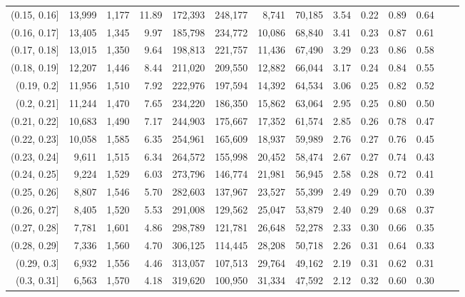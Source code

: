 \begin{tabular}{rrrrrrrrrrrrrr}
(0.15, 0.16]   &  13,999 &  1,177 &   11.89 &  172,393 &  248,177 &   8,741 &  70,185 &  3.54 &  0.22 &  0.89 &      0.64 \\
(0.16, 0.17]   &  13,405 &  1,345 &    9.97 &  185,798 &  234,772 &  10,086 &  68,840 &  3.41 &  0.23 &  0.87 &      0.61 \\
(0.17, 0.18]   &  13,015 &  1,350 &    9.64 &  198,813 &  221,757 &  11,436 &  67,490 &  3.29 &  0.23 &  0.86 &      0.58 \\
(0.18, 0.19]   &  12,207 &  1,446 &    8.44 &  211,020 &  209,550 &  12,882 &  66,044 &  3.17 &  0.24 &  0.84 &      0.55 \\
(0.19, 0.2]    &  11,956 &  1,510 &    7.92 &  222,976 &  197,594 &  14,392 &  64,534 &  3.06 &  0.25 &  0.82 &      0.52 \\
(0.2, 0.21]    &  11,244 &  1,470 &    7.65 &  234,220 &  186,350 &  15,862 &  63,064 &  2.95 &  0.25 &  0.80 &      0.50 \\
(0.21, 0.22]   &  10,683 &  1,490 &    7.17 &  244,903 &  175,667 &  17,352 &  61,574 &  2.85 &  0.26 &  0.78 &      0.47 \\
(0.22, 0.23]   &  10,058 &  1,585 &    6.35 &  254,961 &  165,609 &  18,937 &  59,989 &  2.76 &  0.27 &  0.76 &      0.45 \\
(0.23, 0.24]   &   9,611 &  1,515 &    6.34 &  264,572 &  155,998 &  20,452 &  58,474 &  2.67 &  0.27 &  0.74 &      0.43 \\
(0.24, 0.25]   &   9,224 &  1,529 &    6.03 &  273,796 &  146,774 &  21,981 &  56,945 &  2.58 &  0.28 &  0.72 &      0.41 \\
(0.25, 0.26]   &   8,807 &  1,546 &    5.70 &  282,603 &  137,967 &  23,527 &  55,399 &  2.49 &  0.29 &  0.70 &      0.39 \\
(0.26, 0.27]   &   8,405 &  1,520 &    5.53 &  291,008 &  129,562 &  25,047 &  53,879 &  2.40 &  0.29 &  0.68 &      0.37 \\
(0.27, 0.28]   &   7,781 &  1,601 &    4.86 &  298,789 &  121,781 &  26,648 &  52,278 &  2.33 &  0.30 &  0.66 &      0.35 \\
(0.28, 0.29]   &   7,336 &  1,560 &    4.70 &  306,125 &  114,445 &  28,208 &  50,718 &  2.26 &  0.31 &  0.64 &      0.33 \\
(0.29, 0.3]    &   6,932 &  1,556 &    4.46 &  313,057 &  107,513 &  29,764 &  49,162 &  2.19 &  0.31 &  0.62 &      0.31 \\
(0.3, 0.31]    &   6,563 &  1,570 &    4.18 &  319,620 &  100,950 &  31,334 &  47,592 &  2.12 &  0.32 &  0.60 &      0.30 \\

\end{tabular}
